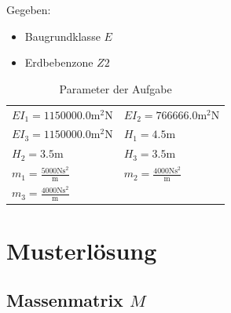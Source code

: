 \documentclass[
  letterpaper,
  DIV=11]{scrreprt}
\providecommand{\tightlist}{%
  \setlength{\itemsep}{0pt}\setlength{\parskip}{0pt}}\usepackage{longtable,booktabs,array}
\begin{document}
Gegeben:

\begin{itemize}
\tightlist
\item
  Baugrundklasse \(E\)
\item
  Erdbebenzone \(Z2\)
\end{itemize}

\hypertarget{tbl-parameter_mms6}{}
\begin{longtable}[]{@{}
  >{\raggedright\arraybackslash}p{}
  >{\raggedright\arraybackslash}p{}@{}}
\caption{\label{tbl-parameter_mms6}Parameter der Aufgabe}\tabularnewline
\toprule\noalign{}
\endfirsthead
\endhead
\bottomrule\noalign{}
\endlastfoot
\(EI_{1} = 1150000.0 \text{m}^{2} \text{N}\) &
\(EI_{2} = 766666.0 \text{m}^{2} \text{N}\) \\
\(EI_{3} = 1150000.0 \text{m}^{2} \text{N}\) &
\(H_{1} = 4.5 \text{m}\) \\
\(H_{2} = 3.5 \text{m}\) & \(H_{3} = 3.5 \text{m}\) \\
\(m_{1} = \frac{5000 \text{N} \text{s}^{2}}{\text{m}}\) &
\(m_{2} = \frac{4000 \text{N} \text{s}^{2}}{\text{m}}\) \\
\(m_{3} = \frac{4000 \text{N} \text{s}^{2}}{\text{m}}\) & \\
\end{longtable}

\newpage{}

\hypertarget{musterluxf6sung-10}{%
\section{Musterlösung}\label{musterluxf6sung-10}}

\hypertarget{massenmatrix-m}{%
\subsection{\texorpdfstring{Massenmatrix
\(M\)}{Massenmatrix M}}\label{massenmatrix-m}}
\end{document}
